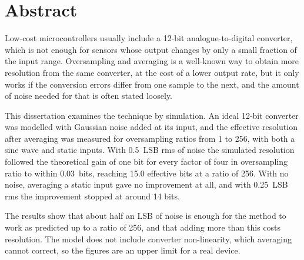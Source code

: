 
\section*{Abstract}
\label{sec:abstract}

Low-cost microcontrollers usually include a 12-bit analogue-to-digital
converter, which is not enough for sensors whose output changes by only a
small fraction of the input range. Oversampling and averaging is a well-known
way to obtain more resolution from the same converter, at the cost of a lower
output rate, but it only works if the conversion errors differ from one sample
to the next, and the amount of noise needed for that is often stated loosely.

This dissertation examines the technique by simulation. An ideal 12-bit
converter was modelled with Gaussian noise added at its input, and the
effective resolution after averaging was measured for oversampling ratios
from 1 to 256, with both a sine wave and static inputs. With
\qty{0.5}{LSB} rms of noise the simulated resolution followed the theoretical
gain of one bit for every factor of four in oversampling ratio to within
0.03~bits, reaching 15.0 effective bits at a ratio of 256. With no noise,
averaging a static input gave no improvement at all, and with
\qty{0.25}{LSB} rms the improvement stopped at around 14 bits.

The results show that about half an LSB of noise is enough for the method to
work as predicted up to a ratio of 256, and that adding more than this costs
resolution. The model does not include converter non-linearity, which
averaging cannot correct, so the figures are an upper limit for a real device.

